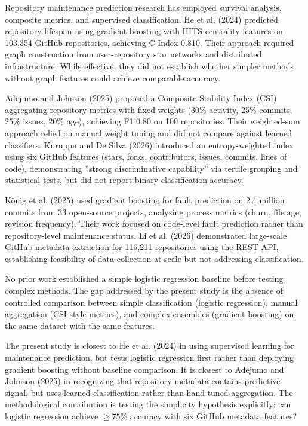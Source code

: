 
Repository maintenance prediction research has employed survival analysis, composite metrics, and supervised classification. He et al. (2024) predicted repository lifespan using gradient boosting with HITS centrality features on 103,354 GitHub repositories, achieving C-Index 0.810. Their approach required graph construction from user-repository star networks and distributed infrastructure. While effective, they did not establish whether simpler methods without graph features could achieve comparable accuracy.

Adejumo and Johnson (2025) proposed a Composite Stability Index (CSI) aggregating repository metrics with fixed weights (30\% activity, 25\% commits, 25\% issues, 20\% age), achieving F1 0.80 on 100 repositories. Their weighted-sum approach relied on manual weight tuning and did not compare against learned classifiers. Kuruppu and De Silva (2026) introduced an entropy-weighted index using six GitHub features (stars, forks, contributors, issues, commits, lines of code), demonstrating ''strong discriminative capability'' via tertile grouping and statistical tests, but did not report binary classification accuracy.

König et al. (2025) used gradient boosting for fault prediction on 2.4 million commits from 33 open-source projects, analyzing process metrics (churn, file age, revision frequency). Their work focused on code-level fault prediction rather than repository-level maintenance status. Li et al. (2026) demonstrated large-scale GitHub metadata extraction for 116,211 repositories using the REST API, establishing feasibility of data collection at scale but not addressing classification.

No prior work established a simple logistic regression baseline before testing complex methods. The gap addressed by the present study is the absence of controlled comparison between simple classification (logistic regression), manual aggregation (CSI-style metrics), and complex ensembles (gradient boosting) on the same dataset with the same features.

The present study is closest to He et al. (2024) in using supervised learning for maintenance prediction, but tests logistic regression first rather than deploying gradient boosting without baseline comparison. It is closest to Adejumo and Johnson (2025) in recognizing that repository metadata contains predictive signal, but uses learned classification rather than hand-tuned aggregation. The methodological contribution is testing the simplicity hypothesis explicitly: can logistic regression achieve $\geq 75$\% accuracy with six GitHub metadata features?
